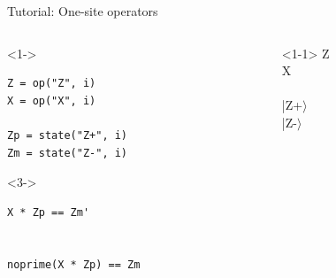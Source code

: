 \begin{frame}[fragile]{Tutorial: One-site operators}

\begin{columns}

\begin{column}{4.5cm}

\begin{onlyenv}<1->
\begin{lstlisting}[language=JuliaLocal, style=julia, basicstyle=\small]
Z = op("Z", i)
X = op("X", i)

Zp = state("Z+", i)
Zm = state("Z-", i)
\end{lstlisting}
\end{onlyenv}

\begin{onlyenv}<3->
\begin{lstlisting}[language=JuliaLocal, style=julia, basicstyle=\small]
X * Zp == Zm'


noprime(X * Zp) == Zm
\end{lstlisting}
\end{onlyenv}

\end{column}

\begin{column}{4.5cm}

\begin{onlyenv}<1-1>
Z \\
X \\
~\\
|Z+$\rangle$ \\
|Z-$\rangle$ \\
\end{onlyenv}


\end{column}
\end{columns}
\end{frame}
